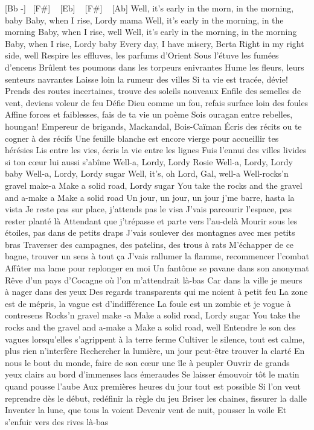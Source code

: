 [Bb -] ~[F#] ~ [Eb] ~ [F#] ~ [Ab]
Well, it's early in the morn, in the morning, baby
Baby, when I rise, Lordy mama
Well, it's early in the morning, in the morning
Baby, when I rise, well
Well, it's early in the morning, in the morning
Baby, when I rise, Lordy baby
Every day, I have misery, Berta
Right in my right side, well
Respire les effluves, les parfums d'Orient
Sous l'étuve les fumées d'encens
Brûlent tes poumons dans les torpeurs enivrantes
Hume les fleurs, leurs senteurs navrantes
Laisse loin la rumeur des villes
Si ta vie est tracée, dévie!
Prends des routes incertaines, trouve des soleils nouveaux
Enfile des semelles de vent, deviens voleur de feu
Défie Dieu comme un fou, refais surface loin des foules
Affine forces et faiblesses, fais de ta vie un poème
Sois ouragan entre rebelles, houngan!
Empereur de brigands, Mackandal, Bois-Caïman
Écris des récits ou te cogner à des récifs
Une feuille blanche est encore vierge pour accueillir tes hérésies
Lis entre les vies, écris la vie entre les lignes
Fuis l'ennui des villes livides si ton cœur lui aussi s'abîme
Well-a, Lordy, Lordy Rosie
Well-a, Lordy, Lordy baby
Well-a, Lordy, Lordy sugar
Well, it's, oh Lord, Gal, well-a
Well-rocks'n gravel make-a
Make a solid road, Lordy sugar
You take the rocks and the gravel and a-make a
Make a solid road
Un jour, un jour, un jour j'me barre, hasta la vista
Je reste pas sur place, j'attends pas le visa
J'vais parcourir l'espace, pas rester planté là
Attendant que j'trépasse et parte vers l'au-delà
Mourir sous les étoiles, pas dans de petits draps
J'vais soulever des montagnes avec mes petits bras
Traverser des campagnes, des patelins, des trous à rats
M'échapper de ce bagne, trouver un sens à tout ça
J'vais rallumer la flamme, recommencer l'combat
Affûter ma lame pour replonger en moi
Un fantôme se pavane dans son anonymat
Rêve d'un pays d'Cocagne où l'on m'attendrait là-bas
Car dans la ville je meurs à nager dans des yeux
Des regards transparents qui me noient à petit feu
La zone est de mépris, la vague est d'indifférence
La foule est un zombie et je vogue à contresens
Rocks'n gravel make -a
Make a solid road, Lordy sugar
You take the rocks and the gravel and a-make a
Make a solid road, well
Entendre le son des vagues lorsqu'elles s'agrippent à la terre ferme
Cultiver le silence, tout est calme, plus rien n'interfère
Rechercher la lumière, un jour peut-être trouver la clarté
En nous le bout du monde, faire de son cœur une île à peupler
Ouvrir de grands yeux clairs au bord d'immenses lacs émeraudes
Se laisser émouvoir tôt le matin quand pousse l'aube
Aux premières heures du jour tout est possible
Si l'on veut reprendre dès le début, redéfinir la règle du jeu
Briser les chaines, fissurer la dalle
Inventer la lune, que tous la voient
Devenir vent de nuit, pousser la voile
Et s'enfuir vers des rives là-bas
